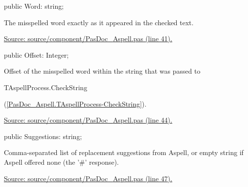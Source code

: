 \documentclass{report}
\newif\ifpdf
\begin{document}
\begin{list}{}{
\setlength{\itemindent}{0cm}
\setlength{\listparindent}{0cm}
\setlength{\leftmargin}{\evensidemargin}
\addtolength{\leftmargin}{\tmplength}
\settowidth{\labelsep}{X}
\addtolength{\leftmargin}{\labelsep}
\setlength{\labelwidth}{\tmplength}
}
\label{PasDoc_Aspell.TSpellingError-Word}
\item[\textbf{Word}\hfill]
\ifpdf
\begin{flushleft}
\fi
\begin{ttfamily}
public Word: string;\end{ttfamily}

\ifpdf
\end{flushleft}
\fi


\par The misspelled word exactly as it appeared in the checked text.\par
\href{https://github.com/pasdoc/pasdoc/blob/master/source/component/PasDoc_Aspell.pas#L41}{Source: source/component/PasDoc{\_}Aspell.pas (line 41).}\label{PasDoc_Aspell.TSpellingError-Offset}
\item[\textbf{Offset}\hfill]
\ifpdf
\begin{flushleft}
\fi
\begin{ttfamily}
public Offset: Integer;\end{ttfamily}

\ifpdf
\end{flushleft}
\fi


\par Offset of the misspelled word within the string that was passed to \begin{ttfamily}TAspellProcess.CheckString\end{ttfamily}(\ref{PasDoc_Aspell.TAspellProcess-CheckString}).\par
\href{https://github.com/pasdoc/pasdoc/blob/master/source/component/PasDoc_Aspell.pas#L44}{Source: source/component/PasDoc{\_}Aspell.pas (line 44).}\label{PasDoc_Aspell.TSpellingError-Suggestions}
\item[\textbf{Suggestions}\hfill]
\ifpdf
\begin{flushleft}
\fi
\begin{ttfamily}
public Suggestions: string;\end{ttfamily}

\ifpdf
\end{flushleft}
\fi


\par Comma{-}separated list of replacement suggestions from Aspell, or empty string if Aspell offered none (the '{\#}' response).\par
\href{https://github.com/pasdoc/pasdoc/blob/master/source/component/PasDoc_Aspell.pas#L47}{Source: source/component/PasDoc{\_}Aspell.pas (line 47).}\end{list}
\ifpdf
\end{document}
